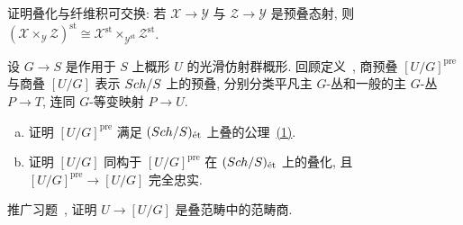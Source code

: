 \begin{exercise}[细节]\label{src:3.5.20}
证明叠化与纤维积可交换: 若 $\mathcal X\to\mathcal Y$ 与 $\mathcal Z\to\mathcal Y$ 是预叠态射, 则 $(\mathcal X\times_{\mathcal Y}\mathcal Z)^{\mathrm{st}}\cong\mathcal X^{\mathrm{st}}\times_{\mathcal Y^{\mathrm{st}}}\mathcal Z^{\mathrm{st}}$.
\end{exercise}
\begin{exercise}[有益的练习]\label{src:3.5.21}
设 $G\to S$ 是作用于 $S$ 上概形 $U$ 的光滑仿射群概形. 回顾定义~, 商预叠 $[U/G]^{\mathrm{pre}}$ 与商叠 $[U/G]$ 表示 $Sch/S$ 上的预叠, 分别分类平凡主 $G$-丛和一般的主 $G$-丛 $P\to T$, 连同 $G$-等变映射 $P\to U$.
\begin{enumerate}[(a)]
\item 证明 $[U/G]^{\mathrm{pre}}$ 满足 $(Sch/S)_{\text{ét}}$ 上叠的公理~\hyperlink{stack-axiom-1}{(1)}.
\item 证明 $[U/G]$ 同构于 $[U/G]^{\mathrm{pre}}$ 在 $(Sch/S)_{\text{ét}}$ 上的叠化, 且 $[U/G]^{\mathrm{pre}}\to[U/G]$ 完全忠实.
\end{enumerate}
\end{exercise}
\begin{exercise}\label{src:3.5.22}
推广习题~, 证明 $U\to[U/G]$ 是叠范畴中的范畴商.
\end{exercise}
